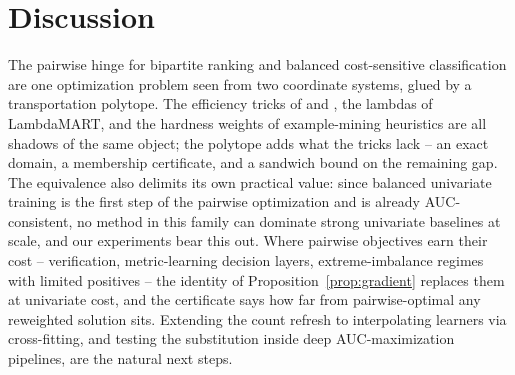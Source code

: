 \documentclass[11pt]{article}
\theoremstyle{remark}
\begin{document}
\section{Discussion}
\label{sec:discussion}

The pairwise hinge for bipartite ranking and balanced cost-sensitive
classification are one optimization problem seen from two coordinate
systems, glued by a transportation polytope. The efficiency tricks of
\citet{joachims2005} and \citet{chapelle2010}, the lambdas of
LambdaMART, and the hardness weights of example-mining heuristics are all
shadows of the same object; the polytope adds what the tricks lack -- an
exact domain, a membership certificate, and a sandwich bound on the
remaining gap. The equivalence also delimits its own practical value: since
balanced univariate training is the first step of the pairwise optimization
and is already AUC-consistent, no method in this family can dominate strong
univariate baselines at scale, and our experiments bear this out. Where
pairwise objectives earn their cost -- verification, metric-learning
decision layers, extreme-imbalance regimes with limited positives
\citep{yang2022} -- the identity of
Proposition~\ref{prop:gradient} replaces them at univariate cost, and the
certificate says how far from pairwise-optimal any reweighted solution
sits. Extending the count refresh to interpolating learners via
cross-fitting, and testing the substitution inside deep AUC-maximization
pipelines, are the natural next steps.



\end{document}
